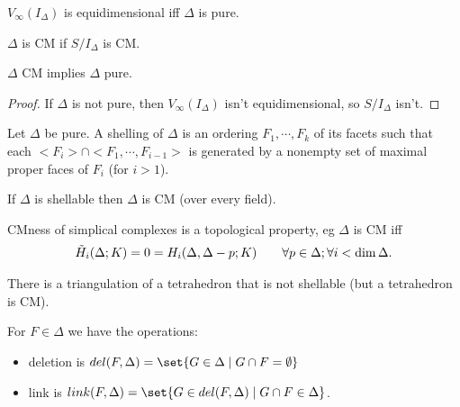 \begin{lemma}
    $V_\infty (I_\Delta)$ is equidimensional iff $\Delta$ is pure.
\end{lemma}

\begin{definition}
    $\Delta$ is CM if $S / I_\Delta $ is CM.
\end{definition}

\begin{lemma}
    $\Delta$ CM implies $\Delta$ pure.
\end{lemma}

\begin{proof}
    If $\Delta$ is not pure, then $V_\infty (I_\Delta) $ isn't equidimensional, so $S/ I_\Delta$ isn't.
\end{proof}

\begin{definition}
    Let $\Delta$ be pure. A shelling of $\Delta$ is an ordering $F_1 , \cdots, F_k$ of its facets such that each $< F_i > \cap <F_1 , \cdots , F_{i-1}>$ is generated by a nonempty set of maximal proper faces of $F_i$ (for $i > 1$).
\end{definition}

\begin{theorem}
    If $\Delta$ is shellable then $\Delta $ is CM (over every field).
\end{theorem}

\begin{theorem}
    CMness of simplical complexes is a topological property, eg $\Delta$ is CM iff
    \begin{align*}
        \Tilde{H}_i( \Delta ; K ) = 0 = H_i (\Delta, \Delta - p ; K) \qquad \forall p \in \Delta; \forall  i < \dim \Delta.
    \end{align*}
\end{theorem}

\begin{theorem}
    There is a triangulation of a tetrahedron that is not shellable (but a tetrahedron is CM).
\end{theorem}

\begin{definition}
    For $F \in \Delta$ we have the operations:
    \begin{itemize}
        \item deletion is $del(F,\Delta) = \set{ G \in \Delta \mid G \cap F = \emptyset}$
        \item link is $link(F,\Delta) = \set{G \in del(F, \Delta) \mid G \cap F \in \Delta}$.
    \end{itemize}
\end{definition}

